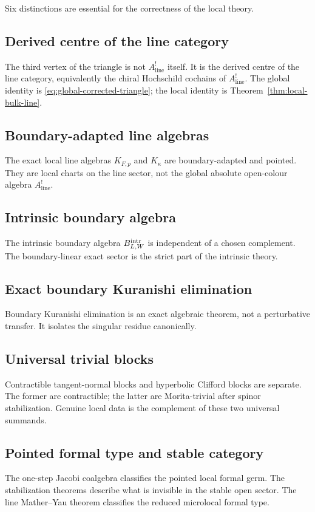 Six distinctions are essential for the correctness of the local theory.

\subsection*{Derived centre of the line category}
The third vertex of the triangle is not $A^!_{\mathrm{line}}$ itself.
It is the derived centre of the line category, equivalently the chiral
Hochschild cochains of $A^!_{\mathrm{line}}$. The global identity is
\eqref{eq:global-corrected-triangle}; the local identity is
Theorem~\ref{thm:local-bulk-line}.

\subsection*{Boundary-adapted line algebras}
The exact local line algebras $K_{F,p}$ and $K_\kappa$ are
boundary-adapted and pointed. They are local charts on the line sector,
not the global absolute open-colour algebra $A^!_{\mathrm{line}}$.

\subsection*{Intrinsic boundary algebra}
The intrinsic boundary algebra $B^{\mathrm{intr}}_{L,W}$ is independent of a
chosen complement. The boundary-linear exact sector is the strict part
of the intrinsic theory.

\subsection*{Exact boundary Kuranishi elimination}
Boundary Kuranishi elimination is an exact algebraic theorem, not a
perturbative transfer. It isolates the singular residue canonically.

\subsection*{Universal trivial blocks}
Contractible tangent-normal blocks and hyperbolic Clifford blocks are
separate. The former are contractible; the latter are Morita-trivial
after spinor stabilization. Genuine local data is the complement of
these two universal summands.

\subsection*{Pointed formal type and stable category}
The one-step Jacobi coalgebra classifies the pointed local formal germ.
The stabilization theorems describe what is invisible in the stable
open sector. The line Mather--Yau theorem classifies the reduced
microlocal formal type.

